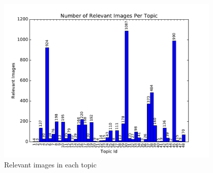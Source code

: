 \begin{figure}[h]
    \centering
    \includegraphics[width=0.95\textwidth]{graphs/relevant-images}
    \caption{Relevant images in each topic}
    \label{fig:relevant-images}
\end{figure}








